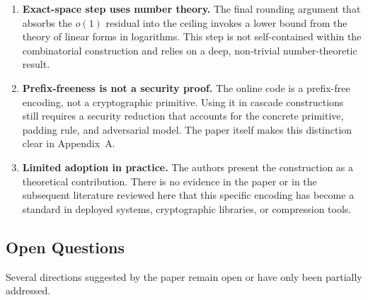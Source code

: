 \begin{enumerate}[label=(\arabic*)]
\item \textbf{Exact-space step uses number theory.}
  The final rounding argument that absorbs the $o(1)$ residual into the
  ceiling invokes a lower bound from the theory of linear forms in
  logarithms.  This step is not self-contained within the combinatorial
  construction and relies on a deep, non-trivial number-theoretic result.

\item \textbf{Prefix-freeness is not a security proof.}
  The online code is a prefix-free encoding, not a cryptographic primitive.
  Using it in cascade constructions still requires a security reduction that
  accounts for the concrete primitive, padding rule, and adversarial model.
  The paper itself makes this distinction clear in Appendix~A.

\item \textbf{Limited adoption in practice.}
  The authors present the construction as a theoretical contribution.  There
  is no evidence in the paper or in the subsequent literature reviewed here
  that this specific encoding has become a standard in deployed systems,
  cryptographic libraries, or compression tools.

\end{enumerate}

\subsection{Open Questions}

Several directions suggested by the paper remain open or have only been
partially addressed.

